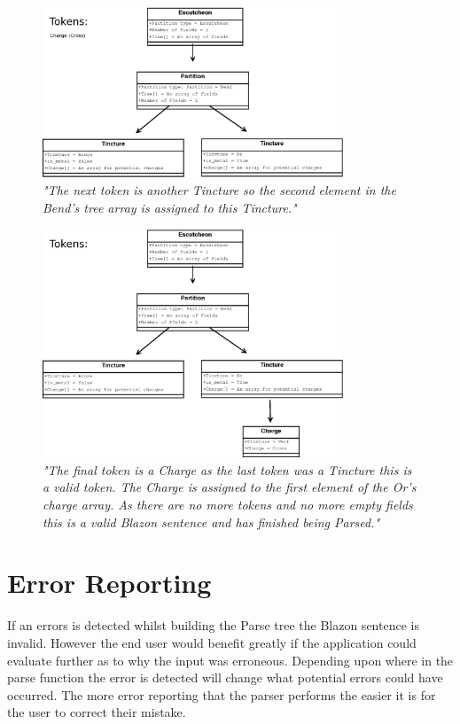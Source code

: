 \begin{figure}[H]
  \centering
    \includegraphics[width=0.8\textwidth]{parsing/images/Parsing2.eps}
  \caption{\emph{"The next token is another Tincture so the second element in the Bend's tree array is assigned to this Tincture."}}
  
\end{figure}

\begin{figure}[H]
  \centering
    \includegraphics[width=0.8\textwidth]{parsing/images/Parsing1.eps}
  \caption{\emph{"The final token is a Charge as the last token was a Tincture this is a valid token.  The Charge is assigned to the first element of the Or's charge array. As there are no more tokens and no more empty fields this is a valid Blazon sentence and has finished being Parsed."}}
  \label{fig:tree}
\end{figure}

\section{Error Reporting}

If an errors is detected whilst building the Parse tree the Blazon sentence is invalid.  However the end user would benefit greatly if the application could evaluate further as to why the input was erroneous.  Depending upon where in the parse function the error is detected will change what potential errors could have occurred.  The more error reporting that the parser performs the easier it is for the user to correct their mistake. 

